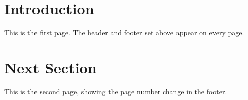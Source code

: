 \documentclass{article}
\begin{document}
	\section{Introduction}
	This is the first page. The header and footer set above appear on every page.
	\newpage
	\section{Next Section}
	This is the second page, showing the page number change in the footer.
\end{document}
